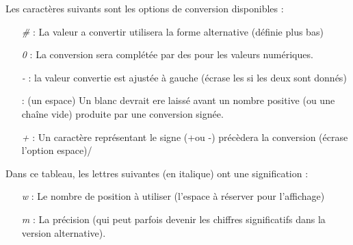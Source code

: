 \documentclass[a4paper,twoside]{article}
\begin{document}
Les caractères suivants sont les options de conversion disponibles :
\begin{itemize}
\item[\emph{\#}]: La valeur a convertir utilisera la forme alternative (définie plus bas)
\item[\emph{0}]: La conversion sera complétée par des \fg pour les valeurs numériques.
\item[\emph{-}]: la valeur convertie est ajustée à gauche (écrase les \fg si les deux sont donnés)
\item[\emph{ }]: (un espace) Un blanc devrait ere laissé avant un nombre positive (ou une chaîne vide) produite par une conversion signée.
\item[\emph{+}]: Un caractère représentant le signe (\og+\fg ou \og-\fg) précèdera la conversion (écrase l'option \og espace\fg)/
\end{itemize}

Dans ce tableau, les lettres suivantes (en italique) ont une signification :
\begin{itemize}
\item[\emph{w}]: Le nombre de position à utiliser (l'espace à réserver pour l'affichage)
\item[\emph{m}]: La précision (qui peut parfois devenir les chiffres significatifs dans la version alternative).
\end{itemize}
\end{document}
